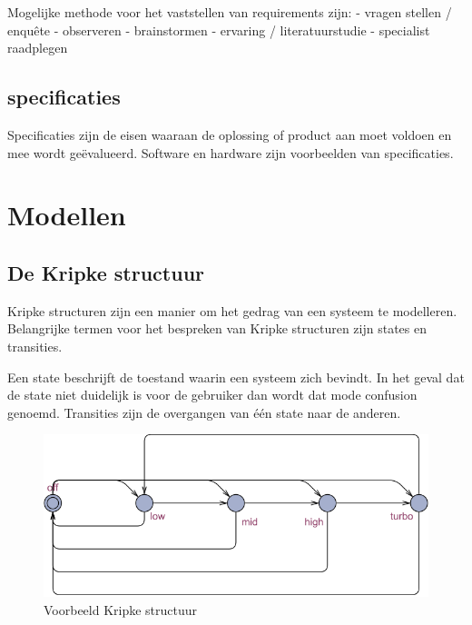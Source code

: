 \documentclass{article}
\begin{document}
Mogelijke methode voor het vaststellen van requirements zijn: \newline
- vragen stellen / enquête \newline
- observeren \newline
- brainstormen \newline
- ervaring / literatuurstudie \newline
- specialist raadplegen \newline


\subsection{specificaties}

Specificaties zijn de eisen waaraan de oplossing of product aan moet voldoen en mee wordt geëvalueerd. Software en hardware zijn voorbeelden van specificaties.

\section{Modellen}

\subsection{De Kripke structuur}

Kripke structuren zijn een manier om het gedrag van een systeem te modelleren. Belangrijke termen voor het bespreken van Kripke structuren zijn states en transities. \newline

Een state beschrijft de toestand waarin een systeem zich bevindt. In het geval dat de state niet duidelijk is voor de gebruiker dan wordt dat mode confusion genoemd. Transities zijn de overgangen van één state naar de anderen. 

\begin{figure}[!h]
	\centering
	\includegraphics[width=\textwidth]{kripke_structure_example1}
    \caption{Voorbeeld Kripke structuur}
\end{figure}
\end{document}

